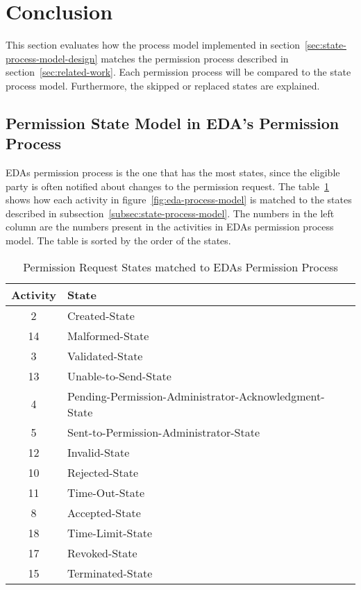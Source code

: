 \section{Conclusion}\label{sec:conclusion}
This section evaluates how the process model implemented in section\ \ref{sec:state-process-model-design} matches the permission process described in section\ \ref{sec:related-work}.
Each permission process will be compared to the state process model.
Furthermore, the skipped or replaced states are explained.

\subsection{Permission State Model in EDA's Permission Process}\label{subsec:permission-state-model-in-eda's-permission-process}
EDAs permission process is the one that has the most states, since the eligible party is often notified about changes to the permission request.
The table\ \ref{tab:eda-matched-states} shows how each activity in figure\ \ref{fig:eda-process-model} is matched to the states described in subsection\ \ref{subsec:state-process-model}.
The numbers in the left column are the numbers present in the activities in EDAs permission process model.
The table is sorted by the order of the states.

\begin{table}[h]
    \centering
    \begin{tabular}{|c|l|}
        \hline
        \textbf{Activity} & \textbf{State} \\
        \hline
        2 & Created-State \\
        14 & Malformed-State \\
        3 & Validated-State \\
        13 & Unable-to-Send-State \\
        4 & Pending-Permission-Administrator-Acknowledgment-State \\
        5 & Sent-to-Permission-Administrator-State \\
        12 & Invalid-State \\
        10 & Rejected-State \\
        11 & Time-Out-State \\
        8 & Accepted-State \\
        18 & Time-Limit-State \\
        17 & Revoked-State \\
        15 & Terminated-State \\
        \hline
    \end{tabular}
    \caption{Permission Request States matched to EDAs Permission Process}
    \label{tab:eda-matched-states}
\end{table}
